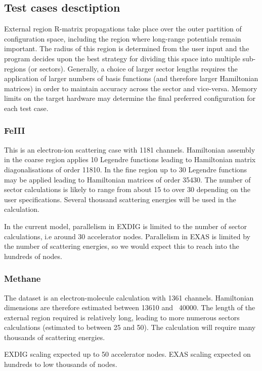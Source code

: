 \subsection{Test cases desctiption}
External region R-matrix propagations take place over the outer partition of configuration space, including the region where long-range potentials remain important. The radius of this region is determined from the user input and the program decides upon the best strategy for dividing this space into multiple sub-regions (or sectors). Generally, a choice of larger sector lengths requires the application of larger numbers of basis functions (and therefore larger Hamiltonian matrices) in order to maintain accuracy across the sector and vice-versa. Memory limits on the target hardware may determine the final preferred configuration for each test case.

\subsubsection{FeIII}
This is an electron-ion scattering case with 1181 channels. Hamiltonian assembly in the coarse region applies 10 Legendre functions leading to Hamiltonian matrix diagonalisations of order 11810. In the fine region up to 30 Legendre functions may be applied leading to Hamiltonian matrices of order 35430. The number of sector calculations is likely to range from about 15 to over 30 depending on the user specifications. Several thousand scattering energies will be used in the calculation.

In the current model, parallelism in EXDIG is limited to the number of sector calculations, i.e around 30 accelerator nodes. Parallelism in EXAS is limited by the number of scattering energies, so we would expect this to reach into the hundreds of nodes.

\subsubsection{Methane}
The dataset is an electron-molecule calculation with 1361 channels. Hamiltonian dimensions are therefore estimated between 13610 and ~40000. The length of the external region required is relatively long, leading to more numerous sectors calculations (estimated to between 25 and 50). The calculation will require many thousands of scattering energies.

EXDIG scaling expected up to 50 accelerator nodes. EXAS scaling expected on hundreds to low thousands of nodes.

